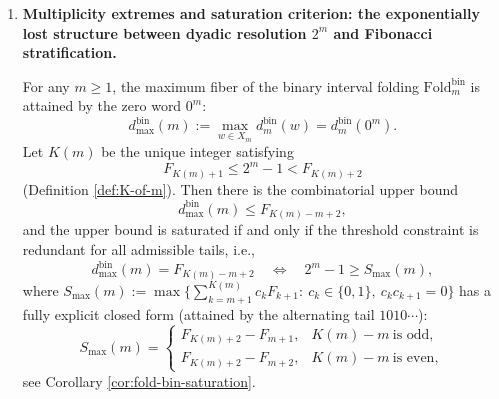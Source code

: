 \begin{enumerate}
  \begin{corollary}[The \texorpdfstring{$\delta=34$}{delta=34} double-layer covering and discrete parity selection law]
  \label{cor:terminal-delta-parity-rule}
  The boundary sector \(X_6^{\mathrm{bdry}}\) of window-\(6\) under dyadic uplift exhibits a canonical double-layer covering: each boundary word has exactly two preimages, with their difference strictly \(34=F_9\), thereby inducing an intrinsic \(\ZZ_2\) sheet parity grading (Table \ref{tab:fold6_boundary_sheet_pairs}).
  Furthermore, the boundary sheet-flip induces a canonical central embedding
  \((\ZZ_2)^3\hookrightarrow Z(\mathcal{G}^{\mathrm{bin}}_6)\) in the direct product decomposition of the fold-gauge group \(\mathcal{G}^{\mathrm{bin}}_6=\mathrm{Aut}(\mathrm{Fold}^{\mathrm{bin}}_6)\), contributed independently by the \(S_2\) factors of the three boundary fibers (\(\texttt{100001},\texttt{100101},\texttt{101001}\)) (Corollary \ref{cor:fold-bin-boundary-center-z2}; see also the corresponding rows in Table \ref{tab:fold_bin_gauge_m6_fibers}).
  Under a protocol gate requiring observable coupling to be compatible with this grading, bulk-boundary mixing terms must be realized via the \(\delta=34\) sheet flip, yielding a discrete selection law requiring no continuous fine-tuning (see the ``\(\delta\)-parity'' discussion paragraph in \S\ref{subsec:bdry-tower-zeck-gut}).
  \end{corollary}

  \item \textbf{Multiplicity extremes and saturation criterion: the exponentially lost structure between dyadic resolution \texorpdfstring{$2^m$}{2^m} and Fibonacci stratification.}

  \begin{theorem}
  \label{thm:terminal-foldbin-saturation-diophantine}
  For any \(m\ge 1\), the maximum fiber of the binary interval folding \(\mathrm{Fold}^{\mathrm{bin}}_m\) is attained by the zero word \(0^m\):
  \[
  d^{\mathrm{bin}}_{\max}(m):=\max_{w\in X_m}d^{\mathrm{bin}}_m(w)=d^{\mathrm{bin}}_m(0^m).
  \]
  Let \(K(m)\) be the unique integer satisfying
  \[
  F_{K(m)+1}\le 2^m-1 < F_{K(m)+2}
  \]
  (Definition \ref{def:K-of-m}). Then there is the combinatorial upper bound
  \[
  d^{\mathrm{bin}}_{\max}(m)\le F_{K(m)-m+2},
  \]
  and the upper bound is saturated if and only if the threshold constraint is redundant for all admissible tails, i.e.,
  \[
  d^{\mathrm{bin}}_{\max}(m)=F_{K(m)-m+2}
  \quad\Longleftrightarrow\quad
  2^m-1\ge S_{\max}(m),
  \]
  where
  \(
  S_{\max}(m)
  :=\max\{\sum_{k=m+1}^{K(m)}c_kF_{k+1}:\ c_k\in\{0,1\},\ c_kc_{k+1}=0\}
  \)
  has a fully explicit closed form (attained by the alternating tail \(1010\cdots\)):
  \[
  S_{\max}(m)=
  \begin{cases}
  F_{K(m)+2}-F_{m+1}, & K(m)-m\ \text{is odd},\\
  F_{K(m)+2}-F_{m+2}, & K(m)-m\ \text{is even},
  \end{cases}
  \]
  see Corollary \ref{cor:fold-bin-saturation}.
  \end{theorem}


\end{enumerate}
